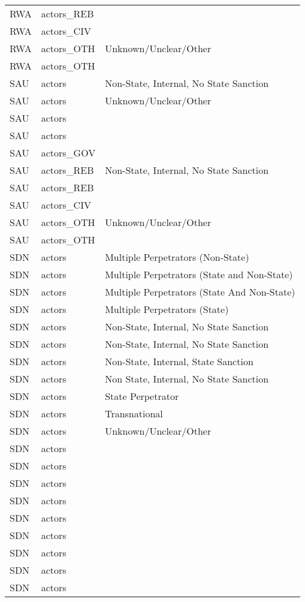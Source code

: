 \begin{table}[ht]
\begin{tabular}{lll}
  RWA & actors\_REB &  \\ 
  RWA & actors\_CIV &  \\ 
  RWA & actors\_OTH & Unknown/Unclear/Other \\ 
  RWA & actors\_OTH &  \\ 
  SAU & actors & Non-State, Internal, No State Sanction \\ 
  SAU & actors & Unknown/Unclear/Other \\ 
  SAU & actors &  \\ 
  SAU & actors &  \\ 
  SAU & actors\_GOV &  \\ 
  SAU & actors\_REB & Non-State, Internal, No State Sanction \\ 
  SAU & actors\_REB &  \\ 
  SAU & actors\_CIV &  \\ 
  SAU & actors\_OTH & Unknown/Unclear/Other \\ 
  SAU & actors\_OTH &  \\ 
  SDN & actors & Multiple Perpetrators (Non-State) \\ 
  SDN & actors & Multiple Perpetrators (State and Non-State) \\ 
  SDN & actors & Multiple Perpetrators (State And Non-State) \\ 
  SDN & actors & Multiple Perpetrators (State) \\ 
  SDN & actors & Non-State, Internal, No State Sanction \\ 
  SDN & actors & Non-State, Internal, No State Sanction \\ 
  SDN & actors & Non-State, Internal, State Sanction \\ 
  SDN & actors & Non State, Internal, No State Sanction \\ 
  SDN & actors & State Perpetrator \\ 
  SDN & actors & Transnational \\ 
  SDN & actors & Unknown/Unclear/Other \\ 
  SDN & actors &  \\ 
  SDN & actors &  \\ 
  SDN & actors &  \\ 
  SDN & actors &  \\ 
  SDN & actors &  \\ 
  SDN & actors &  \\ 
  SDN & actors &  \\ 
  SDN & actors &  \\ 
  SDN & actors &  \\ 

\end{tabular}
\end{table}
